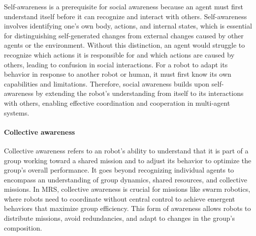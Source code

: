 \documentclass{book}
\begin{document}
Self-awareness is a prerequisite for social awareness because an agent must first understand itself before it can recognize and interact with others. Self-awareness involves identifying one’s own body, actions, and internal states, which is essential for distinguishing self-generated changes from external changes caused by other agents or the environment. Without this distinction, an agent would struggle to recognize which actions it is responsible for and which actions are caused by others, leading to confusion in social interactions. For a robot to adapt its behavior in response to another robot or human, it must first know its own capabilities and limitations. Therefore, social awareness builds upon self-awareness by extending the robot’s understanding from itself to its interactions with others, enabling effective coordination and cooperation in multi-agent systems.



\paragraph{Collective awareness}
Collective awareness refers to an robot's ability to understand that it is part of a group working toward a shared mission and to adjust its behavior to optimize the group's overall performance. It goes beyond recognizing individual agents to encompass an understanding of group dynamics, shared resources, and collective missions. In MRS, collective awareness is crucial for missions like swarm robotics, where robots need to coordinate without central control to achieve emergent behaviors that maximize group efficiency. This form of awareness allows robots to distribute missions, avoid redundancies, and adapt to changes in the group’s composition.
\end{document}
